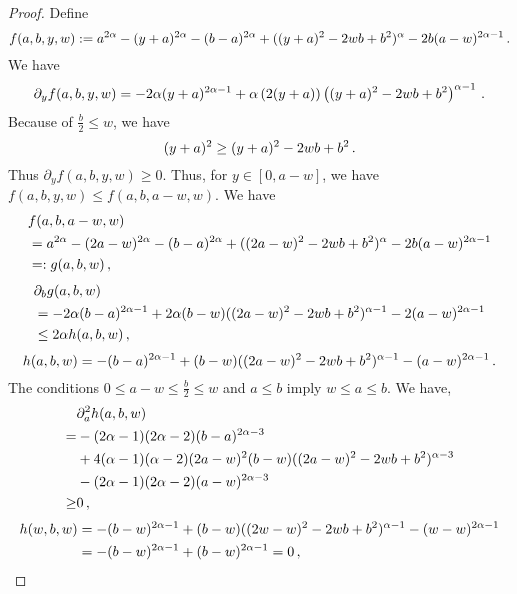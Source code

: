 \begin{proof} 
	Define
	\begin{equation*}
		f(a,b,y,w) := a^{2\alpha}-(y+a)^{2\alpha}-(b-a)^{2\alpha}+((y+a)^2 - 2 w b + b^2)^\alpha - 2 b (a-w)^{2\alpha-1}
		\, .
	\end{equation*}
	We have
	\begin{equation*}
		\partial_y f(a,b,y,w) = -2\alpha(y+a)^{2\alpha-1}+\alpha\left( 2(y+a) \right)\left( (y+a)^2 - 2 w b + b^2 \right)^{\alpha-1}
		\, .
	\end{equation*}
	Because of $\frac{b}2 \leq w$, we have
	\begin{equation*}
		(y+a)^2 \geq  (y+a)^2 - 2 w b + b^2
		\, .
	\end{equation*}
	Thus $\partial_y f(a,b,y,w) \geq 0$.
	Thus, for $y\in[0,a-w]$, we have $f(a,b,y,w) \leq f(a,b,a-w,w)$. We have
	\begin{align*}
		&f(a,b,a-w,w) 
		\\&= a^{2\alpha}-(2a-w)^{2\alpha}-(b-a)^{2\alpha}+((2a-w)^2 - 2 w b + b^2)^\alpha - 2 b (a-w)^{2\alpha-1} 
		\\&=: g(a,b,w)
		\, ,
	\end{align*}
	\begin{align*}
		&\partial_b g(a,b,w) 
		\\&= -2\alpha(b-a)^{2\alpha-1}+2\alpha(b-w)((2a-w)^2 - 2 w b + b^2)^{\alpha-1} - 2 (a-w)^{2\alpha-1} 
		\\&\leq  2\alpha h(a,b,w)
		\, ,
	\end{align*}
	\begin{equation*}
		h(a,b,w) = -(b-a)^{2\alpha-1}+(b-w)((2a-w)^2 - 2 w b + b^2)^{\alpha-1} -  (a-w)^{2\alpha-1}
		\, .
	\end{equation*}
	The conditions $0\leq a-w \leq \frac b2 \leq w$ and $a \leq b$ imply $w \leq a \leq b$. We have,
	\begin{align*}
		&\partial_a^2 h(a,b,w) \\= &-(2\alpha-1)(2\alpha-2)(b-a)^{2\alpha-3}\\&+4(\alpha-1)(\alpha-2)(2a-w)^2(b-w)((2a-w)^2 - 2 w b + b^2)^{\alpha-3} \\&-  (2\alpha-1)(2\alpha-2)(a-w)^{2\alpha-3} \\\geq&0
		\, ,
	\end{align*}
	\begin{align*}
		h(w,b,w) 
		&=
		-(b-w)^{2\alpha-1}+(b-w)((2w-w)^2 - 2 w b + b^2)^{\alpha-1} -  (w-w)^{2\alpha-1}
		\\&=
		-(b-w)^{2\alpha-1}+(b-w)^{2\alpha-1} = 0
		\, ,
	\end{align*}

\end{proof}
